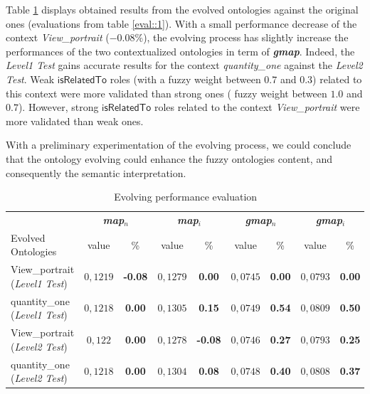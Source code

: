 		Table \ref{ff} displays obtained results from the evolved ontologies against the original 
		ones (evaluations from table \ref{eval::1}). With a small performance decrease of 
		the context \emph{View\_portrait} ($-0.08\%$), the evolving process has slightly increase 
		the performances of the two contextualized ontologies in term of \textit{\textbf{gmap}}.
		Indeed, the \emph{Level1 Test} gains accurate results for the context \emph{quantity\_one} 
		against the \emph{Level2 Test}. Weak $\mathsf{isRelatedTo}$ roles (with a fuzzy weight between $0.7$ and $0.3$)
		related to this context were more validated than strong ones ( fuzzy weight between $1.0$ and $0.7$). 
		However, strong $\mathsf{isRelatedTo}$ roles related to the context \emph{View\_portrait} 
		were more validated than weak ones.

		With a preliminary experimentation of the evolving process, we could conclude that 
		the ontology evolving could enhance the fuzzy ontologies content, and consequently the semantic interpretation.
		
		\begin{table}
	\centering	
	\caption{Evolving performance evaluation}
		\label{ff}
		\begin{tabular}{p{4cm}|cc|cc|cc|cc} 
			
			&\multicolumn{2}{c}{\textbf{\textit{map$_{n}$}}} & 
			\multicolumn{2}{c}{\textbf{\textit{map$_{i}$}}} &
			\multicolumn{2}{c}{\textbf{\textit{gmap$_{n}$}}} & 
			\multicolumn{2}{c}{\textbf{\textit{gmap$_{i}$}}}  \\
			Evolved Ontologies& value & \% & value & \% & value  & \% & value & \% \\
			\hline  
		View\_portrait (\emph{Level1 Test})
		& $0,1219$ & \textbf{-0.08} & $0,1279$ & \textbf{0.00} & $0,0745$ & \textbf{0.00} & $0,0793$ & \textbf{0.00} \\
		quantity\_one (\emph{Level1 Test})
		& $0,1218$ & \textbf{0.00} & $0,1305$ & \textbf{0.15} & $0,0749$ & \textbf{0.54} & $0,0809$ & \textbf{0.50} \\
		\hline
		View\_portrait (\emph{Level2 Test})
		& $0,122$ & \textbf{0.00} & $0,1278$ & \textbf{-0.08} & $0,0746$ & \textbf{0.27} & $0,0793$ & \textbf{0.25} \\
		quantity\_one (\emph{Level2 Test})
		& $0,1218$ & \textbf{0.00} & $0,1304$ & \textbf{0.08} & $0,0748$ & \textbf{0.40} & $0,0808$ & \textbf{0.37} \\
		\hline 
\end{tabular}
\end{table}
		

